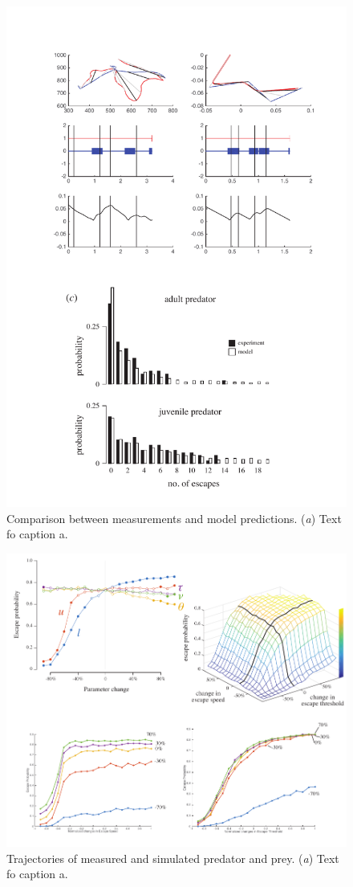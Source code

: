 \documentclass[]{rsos}%
\begin{document}
\begin{figure}[!h]
\centering
	\includegraphics[width=5.5in]{fig_trajectories}
\caption{Comparison between measurements and model predictions. 
(\textit{a}) Text fo caption a.}
\label{fig_traj}
\end{figure}

\begin{figure}[!h]
\centering
	\includegraphics[width=5.5in]{fig_sensitivity}
\caption{Trajectories of measured and simulated predator and prey. 
(\textit{a}) Text fo caption a.}
\label{fig_sense}
\end{figure}

\pagebreak
\end{document}
